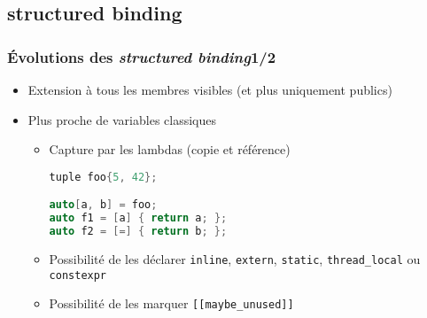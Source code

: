 \documentclass[C++.tex]{subfiles}
\begin{document}
\subsection*{structured binding}
\begin{frame}[fragile]
	\frametitle{Évolutions des \textit{structured binding}\titlehfill{}1/2}
	\begin{itemize}
		\item Extension à tous les membres visibles (et plus uniquement publics)

	
		\item Plus proche de variables \og classiques\fg{}
		\begin{itemize}
			\item Capture par les lambdas (copie et référence)


		\begin{lstlisting}[language=C++]
tuple foo{5, 42};

auto[a, b] = foo;
auto f1 = [a] { return a; };
auto f2 = [=] { return b; };\end{lstlisting}

			\item Possibilité de les déclarer \lstinline|inline|, \lstinline|extern|, \lstinline|static|, \lstinline|thread_local| ou \lstinline|constexpr|
			\item Possibilité de les marquer \lstinline|[[maybe_unused]]|
		\end{itemize}
	\end{itemize}
\end{frame}
\end{document}
